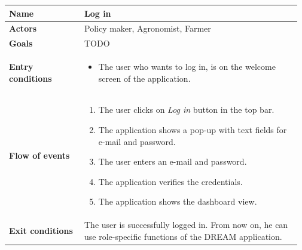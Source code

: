 \begin{table}[H]
    \centering
	\begin{tabular}{@{}p{0.25\linewidth} p{0.72\linewidth}@{}}
\toprule
		\textbf{Name}               & Log in\\
		\midrule
		\textbf{Actors}             & Policy maker, Agronomist, Farmer\\
		\midrule
		\textbf{Goals}              & TODO \\
		\midrule
		
		\textbf{Entry conditions}   & \begin{itemize}[leftmargin=.4cm,noitemsep,topsep=0pt,before=\vspace{-3mm},after=\vspace{-4mm}]
		    \item The user who wants to log in, is  on the welcome screen of the application.
		\end{itemize}\\
		\midrule
		
		\textbf{Flow of events}     & \begin{enumerate}[leftmargin=.4cm,noitemsep,topsep=0pt,before=\vspace{-3mm},after=\vspace{-4mm}]
		    \item The user clicks on \textit{Log in} button in the top bar.
		    \item The application shows a pop-up with text fields for e-mail and password.
		    \item The user enters an e-mail and password.
		    \item The application verifies the credentials.
		    \item The application shows the dashboard view.
		\end{enumerate}\\
		\midrule
		\textbf{Exit conditions}    & The user is successfully logged in. From now on, he can use role-specific functions of the DREAM application. \\
		\midrule
		

\end{tabular}
\end{table}
